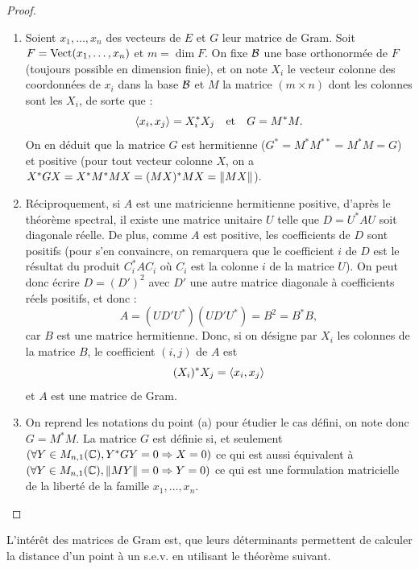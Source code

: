 \begin{proof}

\begin{enumerate}[label=(\alph*)]

\item
Soient $x_1, \dots, x_n$ des vecteurs de $E$ et $G$ leur matrice de Gram. Soit $F = \operatorname{Vect}(x_1, \dots, x_n)$ et $m = \dim{F}$. 
On fixe $\mathcal{B}$ une base orthonormée de $F$ (toujours possible en dimension finie), et on note $X_i$ le vecteur colonne des coordonnées
de $x_i$ dans la base $\mathcal{B}$ et $M$ la matrice $(m \times n)$ dont les colonnes sont les $X_i$, de sorte que :
\[ \langle x_i , x_j\rangle = X_i^{\ast} X_j \quad \text{et} \quad G = M^{\ast}M . \]
On en déduit que la matrice $G$ est hermitienne ($G^{\ast} = M ^{\ast} M^{\ast\ast} = M^{\ast} M = G$) et positive (pour tout vecteur 
colonne $X$, on a $X^{\ast}GX = X^{\ast} M^{\ast} M X = (MX)^{\ast} MX = \lVert MX\rVert$). 

\item
Réciproquement, si $A$ est une matricienne hermitienne positive, d'après le théorème spectral, il existe une matrice unitaire $U$
telle que $D = U^{\ast} A U$ soit diagonale réelle. De plus, comme $A$ est positive, les coefficients de $D$ sont positifs 
(pour s'en convaincre, on remarquera que le coefficient $i$ de $D$ est le résultat du produit $C_i^{\ast} A C_i$ où $C_i$ est la colonne
$i$ de la matrice $U$). On peut donc écrire $D= (D')^2$ avec $D'$ une autre matrice diagonale à coefficients réels positifs, et donc :
\[ A = (U D' U^{\ast} ) (U D' U^{\ast}) = B^2 = B^{\ast} B , \]
car $B$ est une matrice hermitienne. Donc, si on désigne par $X_i$ les colonnes de la matrice $B$, le coefficient $(i,j)$ de $A$ est 
\[ (X_i)^{\ast} X_j = \langle x_i, x_j\rangle \]
et $A$ est une matrice de Gram. 

\item
On reprend les notations du point (a) pour étudier le cas défini, on note donc $G = M^{\ast}M$. 
La matrice $G$ est définie si, et seulement $(\forall Y \in M_{n,1}(\mathbb{C}), Y^{\ast} G Y = 0 \Rightarrow X = 0)$ ce qui est aussi équivalent à
$(\forall Y \in M_{n,1}(\mathbb{C}), \lVert M Y\rVert = 0 \Rightarrow Y = 0)$ ce qui est une formulation matricielle de la liberté de la famille 
$x_1, \dots, x_n$.

\end{enumerate}
\end{proof}

L'intérêt des matrices de Gram est, que leurs déterminants permettent de calculer la distance d'un point à un s.e.v. en utilisant le 
théorème suivant.

